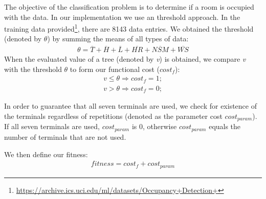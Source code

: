 The objective of the classification problem is to determine if a room is occupied with the data. In our implementation we use an threshold approach. In the training data provided\footnote{\url{https://archive.ics.uci.edu/ml/datasets/Occupancy+Detection+}}, there are 8143 data entries. We obtained the threshold (denoted by $\theta$) by summing the means of all types of data:
\begin{align*}
\theta = \overline{T} + \overline{H} + \overline{L} + \overline{HR} + \overline{NSM} + \overline{WS}
\end{align*}
When the evaluated value of a tree (denoted by \emph{v}) is obtained, we compare \emph{v} with the threshold $\theta$ to form our functional cost ($cost_f$):
\begin{align*}
v \leq \theta \Rightarrow cost_f = 1;\\
v > \theta \Rightarrow cost_f = 0;
\end{align*}

In order to guarantee that all seven terminals are used, we check for existence of the terminals regardless of repetitions (denoted as the parameter cost $cost_{param}$). If all seven terminals are used, $cost_{param}$ is 0, otherwise $cost_{param}$ equals the number of terminals that are not used. 

We then define our fitness:
\begin{align*}
fitness = cost_f + cost_{param}
\end{align*}

